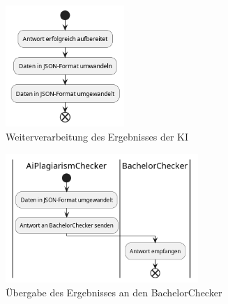 \begin{figure}[H]
    \centering
    \includegraphics[width=0.4\textwidth]{images/diagrams/bpd/WeiterverarbeitungDesErgebnissesDerKI/GPD-Weiterverarbeitung des Ergebnisses der KI}
    \caption{Weiterverarbeitung des Ergebnisses der KI}
    \label{fig:weiterverarbeitungDesErgebnissesDerKI}
\end{figure}

\begin{figure}[H]
    \centering
    \includegraphics[width=0.65\textwidth]{images/diagrams/bpd/ÜbergabeDesErgebnissesAnDenBachelorChecker/GPD-Übergabe des Ergebnisses an den BachelorChecker}
    \caption{Übergabe des Ergebnisses an den BachelorChecker}
    \label{fig:uebergabeDesErgebnissesAnDenBachelorChecker}
\end{figure}

